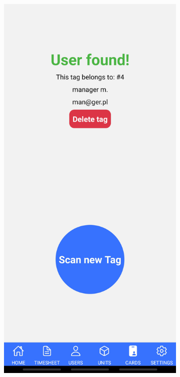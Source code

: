 \begin{figure}[H]
\begin{subfigure}[b]{0.3\textwidth}
    \end{subfigure}
    \begin{subfigure}[b]{0.3\textwidth}
        \centering
        \includegraphics[width=\textwidth, frame]{graf/mobile/cardOwned.jpg}

\end{subfigure}
\end{figure}
